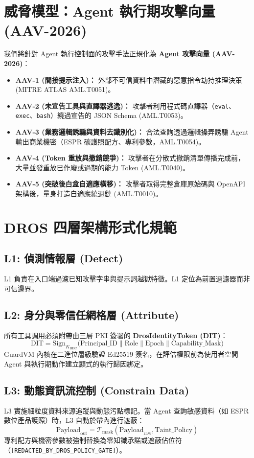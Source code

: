 \documentclass[conference]{IEEEtran}
\begin{document}
\section{威脅模型：Agent 執行期攻擊向量 (AAV-2026)}
我們將針對 Agent 執行控制面的攻擊手法正規化為 \textbf{Agent 攻擊向量 (AAV-2026)}：
\begin{itemize}
    \item \textbf{AAV-1 (間接提示注入)：} 外部不可信資料中潛藏的惡意指令劫持推理決策 (MITRE ATLAS AML.T0051)。
    \item \textbf{AAV-2 (未宣告工具與直譯器逃逸)：} 攻擊者利用程式碼直譯器（\texttt{eval}、\texttt{exec}、\texttt{bash}）繞過宣告的 JSON Schema (AML.T0053)。
    \item \textbf{AAV-3 (業務邏輯誘騙與資料去識別化)：} 合法查詢透過邏輯操弄誘騙 Agent 輸出商業機密（ESPR 碳護照配方、專利參數，AML.T0054)。
    \item \textbf{AAV-4 (Token 重放與撤銷競爭)：} 攻擊者在分散式撤銷清單傳播完成前，大量並發重放已作廢或過期的能力 Token (AML.T0040)。
    \item \textbf{AAV-5 (突破後白盒自適應橫移)：} 攻擊者取得完整倉庫原始碼與 OpenAPI 架構後，量身打造自適應繞過鏈 (AML.T0010)。
\end{itemize}

\section{DROS 四層架構形式化規範}

\subsection{L1: 偵測情報層 (Detect)}
L1 負責在入口端過濾已知攻擊字串與提示詞越獄特徵。L1 定位為前置過濾器而非可信邊界。

\subsection{L2: 身分與零信任網格層 (Attribute)}
所有工具調用必須附帶由三層 PKI 簽署的 \textbf{DrosIdentityToken (DIT)}：
\begin{equation}
\text{DIT} = \text{Sign}_{K_{\text{BEC}}}\Big(\text{Principal\_ID} \parallel \text{Role} \parallel \text{Epoch} \parallel \text{Capability\_Mask}\Big)
\end{equation}
GuardVM 內核在二進位層級驗證 Ed25519 簽名，在評估權限前為使用者空間 Agent 與執行期動作建立顯式的執行歸因綁定。

\subsection{L3: 動態資訊流控制 (Constrain Data)}
L3 實施細粒度資料來源追蹤與動態污點標記。當 Agent 查詢敏感資料（如 ESPR 數位產品護照）時，L3 自動於帶內進行遮蔽：
\begin{equation}
\text{Payload}_{\text{out}} = \mathcal{T}_{\text{mask}}(\text{Payload}_{\text{raw}}, \text{Taint\_Policy})
\end{equation}
專利配方與機密參數被強制替換為零知識承諾或遮蔽佔位符（\texttt{[REDACTED\_BY\_DROS\_POLICY\_GATE]}）。
\end{document}
